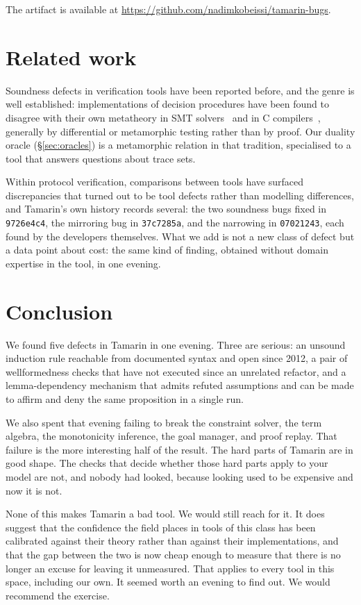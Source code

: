 \documentclass[version=preprint]{iacrcc}
\newcommand{\code}[1]{\texttt{\small #1}}
\theoremstyle{definition}
\theoremstyle{remark}
\begin{document}
The artifact is available at \url{https://github.com/nadimkobeissi/tamarin-bugs}.

\section{Related work}\label{sec:related}

Soundness defects in verification tools have been reported before, and the
genre is well established: implementations of decision procedures have been
found to disagree with their own metatheory in SMT
solvers~\cite{SMTFuzz,SMTDelta} and in C compilers~\cite{Csmith}, generally by
differential or metamorphic testing rather than by proof. Our duality oracle
(\S\ref{sec:oracles}) is a metamorphic relation in that tradition, specialised
to a tool that answers questions about trace sets.

Within protocol verification, comparisons between tools have surfaced
discrepancies that turned out to be tool defects rather than modelling
differences, and Tamarin's own history records several: the two soundness bugs
fixed in \code{9726e4c4}, the mirroring bug in \code{37c7285a}, and the
narrowing in \code{07021243}, each found by the developers themselves. What we
add is not a new class of defect but a data point about cost: the same kind of
finding, obtained without domain expertise in the tool, in one evening.

\section{Conclusion}

We found five defects in Tamarin in one evening. Three are serious: an
unsound induction rule reachable from documented syntax and open since 2012, a
pair of wellformedness checks that have not executed since an unrelated
refactor, and a lemma-dependency mechanism that admits refuted assumptions and
can be made to affirm and deny the same proposition in a single run.

We also spent that evening failing to break the constraint solver, the term
algebra, the monotonicity inference, the goal manager, and proof replay. That
failure is the more interesting half of the result. The hard parts of Tamarin
are in good shape. The checks that decide whether those hard parts apply to
your model are not, and nobody had looked, because looking used to be
expensive and now it is not.

None of this makes Tamarin a bad tool. We would still reach for it. It does
suggest that the confidence the field places in tools of this class has been
calibrated against their theory rather than against their implementations, and
that the gap between the two is now cheap enough to measure that there is no
longer an excuse for leaving it unmeasured. That applies to every tool in this
space, including our own. It seemed worth an evening to find out. We would
recommend the exercise.
\end{document}
